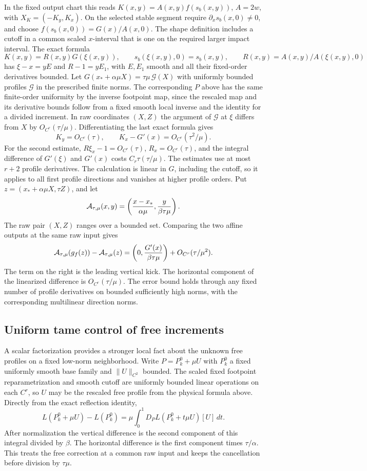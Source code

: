 \documentclass[11pt]{article}
\begin{document}
In the fixed output chart this reads \(K(x,y)=A(x,y)f(s_b(x,y))\), \(A=2w\),
with \(X_K=(-K_y,K_x)\). On the selected stable segment require
\(\partial_x s_b(x,0)\ne0\), and choose \(f(s_b(x,0))=G(x)/A(x,0)\). The shape
definition includes a cutoff in a common scaled \(x\)-interval that is one on
the required larger impact interval. The exact formula \[
 K(x,y)=R(x,y)G(\xi(x,y)),\qquad
 s_b(\xi(x,y),0)=s_b(x,y),\qquad
 R(x,y)=A(x,y)/A(\xi(x,y),0)
\] has \(\xi-x=y E\) and \(R-1=y E_1\), with \(E,E_1\) smooth and all their
fixed-order derivatives bounded. Let
\(G(x_*+\alpha\mu X)=\tau\mu\,\mathcal G(X)\) with uniformly bounded profiles
\(\mathcal G\) in the prescribed finite norms. The corresponding \(P\) above has
the same finite-order uniformity by the inverse footpoint map, since the
rescaled map and its derivative bounds follow from a fixed smooth local inverse
and the identity for a divided increment. In raw coordinates \((X,Z)\) the
argument of \(\mathcal G\) at \(\xi\) differs from \(X\) by
\(O_{C^r}(\tau/\mu)\). Differentiating the last exact formula gives \[
 K_y=O_{C^r}(\tau),\qquad
 K_x-G'(x)=O_{C^r}(\tau^2/\mu).
\] For the second estimate, \(R\xi_x-1=O_{C^r}(\tau)\), \(R_x=O_{C^r}(\tau)\),
and the integral difference of \(G'(\xi)\) and \(G'(x)\) costs
\(C_r\tau(\tau/\mu)\). The estimates use at most \(r+2\) profile derivatives.
The calculation is linear in \(G\), including the cutoff, so it applies to all
first profile directions and vanishes at higher profile orders. Put \(z=(x_*+\alpha\mu X,\tau Z)\), and let
\[
 {\cal A}_{\tau,\mu}(x,y)
   =\left(\frac{x-x_*}{\alpha\mu},\frac{y}{\beta\tau\mu}\right).
\]
The raw pair \((X,Z)\) ranges over a bounded set. Comparing the two
affine outputs at the same raw input gives
\[
 {\cal A}_{\tau,\mu}(g_f(z))-{\cal A}_{\tau,\mu}(z)
  =\left(0,\frac{G'(x)}{\beta\tau\mu}\right)+O_{C^r}(\tau/\mu^2).
\]
The term on the right is the leading vertical kick. The horizontal
component of the linearized difference is \(O_{C^r}(\tau/\mu)\).
The error bound holds through any fixed number of profile derivatives
on bounded sufficiently high norms, with the corresponding multilinear
direction norms.

\subsection{Uniform tame control of free
increments}\label{uniform-tame-control-of-free-increments}

A scalar factorization provides a stronger local fact about the unknown free
profiles on a fixed low-norm neighborhood. Write \(P=P_k^0+\mu U\) with
\(P_k^0\) a fixed uniformly smooth base family and \(\|U\|_{C^2}\)
bounded. The scaled fixed footpoint reparametrization and smooth cutoff are
uniformly bounded linear operations on each \(C^r\), so \(U\) may be the
rescaled free profile from the physical formula above. Directly from the exact
reflection identity, \[
 L(P_k^0+\mu U)-L(P_k^0)
   =\mu\int_0^1 D_P L(P_k^0+t\mu U)[U]\,dt .
\] After normalization the vertical difference is the second component of this
integral divided by \(\beta\). The horizontal difference is the first component
times \(\tau/\alpha\). This treats the free correction at a common raw input and
keeps the cancellation before division by \(\tau\mu\).
\end{document}
